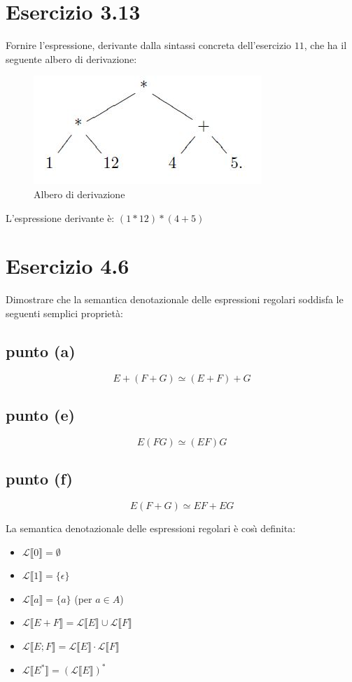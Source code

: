 	\section{Esercizio 3.13}
		Fornire l'espressione, derivante dalla sintassi concreta
		dell'esercizio $11$, che ha il seguente albero di derivazione:
		
		\begin{figure}[h]
			\centering
			\includegraphics[scale=0.5]{img/3-13}
			\caption{Albero di derivazione}
		\end{figure}
		
		\sectionline
		
		L'espressione derivante \`e: $(1*12)*(4+5)$
		
		\newpage
	
	\newpage \section{Esercizio 4.6}
		Dimostrare che la semantica denotazionale delle espressioni regolari
		soddisfa le seguenti semplici propriet\`a:
		\subsection{punto (a)}
			$$E+(F+G) \simeq (E+F)+G$$
		\subsection{punto (e)}
			$$E(FG) \simeq (EF)G$$
		\subsection{punto (f)}
			$$E(F+G) \simeq EF+EG$$
			
		\sectionline
		
		La semantica denotazionale delle espressioni regolari \`{e} cos\`{\i} definita:
		\begin{itemize}
		  \item $\mathcal{L} \llbracket 0 \rrbracket = \emptyset$
		  \item $\mathcal{L} \llbracket 1 \rrbracket = \{\epsilon\}$
		  \item $\mathcal{L} \llbracket a \rrbracket = \{a\}$ (per $a \in A$)
		  \item $\mathcal{L} \llbracket E + F \rrbracket = \mathcal{L} \llbracket E
		  	\rrbracket \cup \mathcal{L} \llbracket F
		  	\rrbracket$
		  \item $\mathcal{L} \llbracket E ; F \rrbracket = \mathcal{L} \llbracket E
		  	\rrbracket \cdot \mathcal{L} \llbracket F
		  	\rrbracket$ 
		  \item $\mathcal{L} \llbracket E^* \rrbracket = (\mathcal{L} \llbracket E
		  	\rrbracket)^*$ 
		\end{itemize}
		
